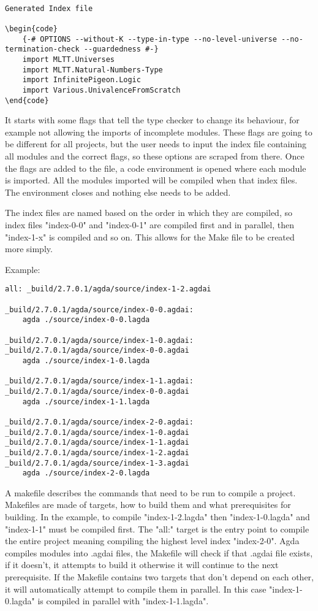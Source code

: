 \begin{lstlisting}
    
Generated Index file

\begin{code}
    {-# OPTIONS --without-K --type-in-type --no-level-universe --no-termination-check --guardedness #-}
    import MLTT.Universes
    import MLTT.Natural-Numbers-Type
    import InfinitePigeon.Logic
    import Various.UnivalenceFromScratch
\end{code}
\end{lstlisting}

It starts with some flags that tell the type checker to change its behaviour,
for example not allowing the imports of incomplete modules. These flags are
going to be different for all projects, but the user needs to input the index
file containing all modules and the correct flags, so these options are scraped
from there. Once the flags are added to the file, a code environment is opened
where each module is imported. All the modules imported will be compiled when
that index files. The environment closes and nothing else needs to be added.


The index files are named based on the order in which they are compiled, so
index files "index-0-0" and "index-0-1" are compiled first and in parallel,
then "index-1-x" is compiled and so on. This allows for the Make file to be
created more simply. 

Example:

\begin{lstlisting}
all: _build/2.7.0.1/agda/source/index-1-2.agdai 

_build/2.7.0.1/agda/source/index-0-0.agdai: 
	agda ./source/index-0-0.lagda

_build/2.7.0.1/agda/source/index-1-0.agdai: _build/2.7.0.1/agda/source/index-0-0.agdai 
	agda ./source/index-1-0.lagda

_build/2.7.0.1/agda/source/index-1-1.agdai: _build/2.7.0.1/agda/source/index-0-0.agdai 
	agda ./source/index-1-1.lagda

_build/2.7.0.1/agda/source/index-2-0.agdai: _build/2.7.0.1/agda/source/index-1-0.agdai _build/2.7.0.1/agda/source/index-1-1.agdai _build/2.7.0.1/agda/source/index-1-2.agdai _build/2.7.0.1/agda/source/index-1-3.agdai 
	agda ./source/index-2-0.lagda
\end{lstlisting}

A makefile describes the commands that need to be run to compile a project.
Makefiles are made of targets, how to build them and what prerequisites for
building. In the example, to compile "index-1-2.lagda" then "index-1-0.lagda"
and "index-1-1" must be compiled first. The "all:" target is the entry point to
compile the entire project meaning compiling the highest level index
"index-2-0". Agda compiles modules into .agdai files, the Makefile will check
if that .agdai file exists, if it doesn't, it attempts to build it otherwise it
will continue to the next prerequisite. If the Makefile contains two targets
that don't depend on each other, it will automatically attempt to compile them
in parallel. In this case "index-1-0.lagda" is compiled in parallel with
"index-1-1.lagda".

